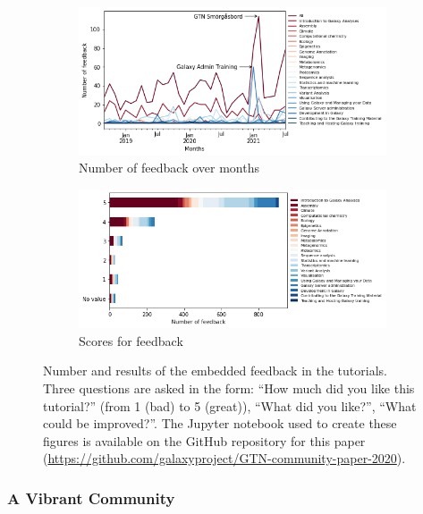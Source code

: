 \documentclass[10pt,letterpaper]{article}
\begin{document}
\begin{figure}[!ht]
	\centering
	\begin{subfigure}[b]{0.7\textwidth}
         \centering
         \includegraphics[width=\textwidth]{images/feedback.png}
         \caption{Number of feedback over months}
         \label{fig:feedback-}
    \end{subfigure}
    \hfill
    \begin{subfigure}[b]{0.7\textwidth}
         \centering
         \includegraphics[width=\textwidth]{images/feedback-scores.png}
         \caption{Scores for feedback}
         \label{fig:feedback-scores}
    \end{subfigure}
	\caption{Number and results of the embedded feedback in the tutorials. Three questions are asked in the form: ``How much did you like this tutorial?'' (from 1 (bad) to 5 (great)), ``What did you like?'', ``What could be improved?''. The Jupyter notebook used to create these figures is available on the GitHub repository for this paper (\url{https://github.com/galaxyproject/GTN-community-paper-2020}).
    \label{fig:feedback}}
\end{figure}


\subsubsection*{A Vibrant Community}
\end{document}
